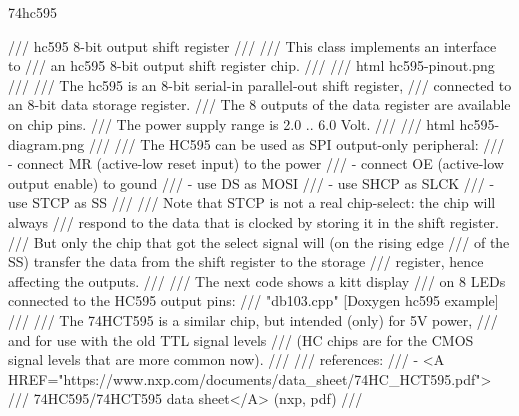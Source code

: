 74hc595

/// hc595 8-bit output shift register
///
/// This class implements an interface to
/// an hc595 8-bit output shift register chip.
///
/// \image html hc595-pinout.png
///
/// The hc595 is an 8-bit serial-in parallel-out shift register,
/// connected to an 8-bit data storage register.
/// The 8 outputs of the data register are available on chip pins.
/// The power supply range is 2.0 .. 6.0 Volt.
///
/// \image html hc595-diagram.png
///
/// The HC595 can be used as SPI output-only peripheral:
///    - connect MR (active-low reset input) to the power
///    - connect OE (active-low output enable) to gound
///    - use DS as MOSI
///    - use SHCP as SLCK
///    - use STCP as SS
///
/// Note that STCP is not a real chip-select: the chip will always
/// respond to the data that is clocked by storing it in the shift register.
/// But only the chip that got the select signal will (on the rising edge
/// of the SS) transfer the data from the shift register to the storage
/// register, hence affecting the outputs.
///
/// The next code shows a kitt display
/// on 8 LEDs connected to the HC595 output pins:
/// \snippet "db103\main.cpp" [Doxygen hc595 example]
///
/// The 74HCT595 is a similar chip, but intended (only) for 5V power,
/// and for use with the old TTL signal levels
/// (HC chips are for the CMOS signal levels that are more common now).
///
/// references:
///    - <A HREF="https://www.nxp.com/documents/data_sheet/74HC_HCT595.pdf">
///       74HC595/74HCT595 data sheet</A> (nxp, pdf)
///
